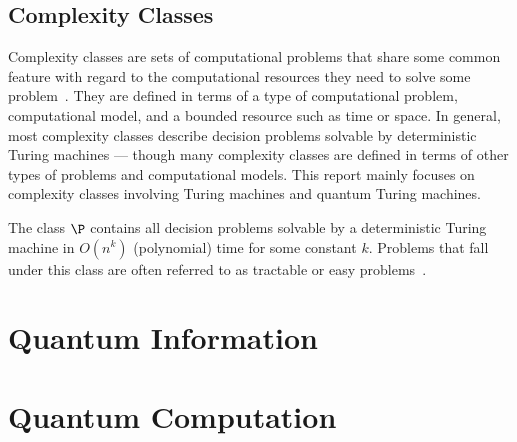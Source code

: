
\subsection{Complexity Classes}
Complexity classes are sets of computational problems that share some common feature with regard to the computational resources they need to solve some problem~\cite{arora2009computational}.
They are defined in terms of a type of computational problem, computational model, and a bounded resource such as time or space.
In general, most complexity classes describe decision problems solvable by deterministic Turing machines --- though many complexity classes are defined in terms of other types of problems and computational models.
This report mainly focuses on complexity classes involving Turing machines and quantum Turing machines.

The class $\P$ contains all decision problems solvable by a deterministic Turing machine in $O(n^k)$ (polynomial) time for some constant $k$.
Problems that fall under this class are often referred to as tractable or easy problems~\cite{cormen2009introduction}.

\section{Quantum Information}

\section{Quantum Computation}